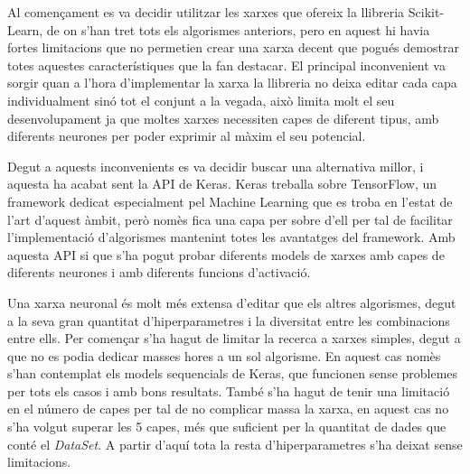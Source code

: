 \documentclass[10pt,a4paper,twocolumn,twoside]{article}
\begin{document}
Al començament es va decidir utilitzar les xarxes que ofereix la llibreria Scikit-Learn, de on s'han tret tots els algorismes anteriors, pero en aquest hi havia fortes limitacions que no permetien crear una xarxa decent que pogués demostrar totes aquestes característiques que la fan destacar. El principal inconvenient va sorgir quan a l'hora d'implementar la xarxa la llibreria no deixa editar cada capa individualment sinó tot el conjunt a la vegada, això limita molt el seu desenvolupament ja que moltes xarxes necessiten capes de diferent tipus, amb diferents neurones per poder exprimir al màxim el seu potencial. 

Degut a aquests inconvenients es va decidir buscar una alternativa millor, i aquesta ha acabat sent la API de Keras. Keras treballa sobre TensorFlow, un framework dedicat especialment pel Machine Learning que es troba en l'estat de l'art d'aquest àmbit, però nomès fica una capa per sobre d'ell per tal de facilitar l'implementació d'algorismes mantenint totes les avantatges del framework. Amb aquesta API si que s'ha pogut probar diferents models de xarxes amb capes de diferents neurones i amb diferents funcions d'activació. 

Una xarxa neuronal és molt més extensa d'editar que els altres algorismes, degut a la seva gran quantitat d'hiperparametres i la diversitat entre les combinacions entre ells. Per començar s'ha hagut de limitar la recerca a xarxes simples, degut a que no es podia dedicar masses hores a un sol algorisme. En aquest cas nomès s'han contemplat els models sequencials de Keras, que funcionen sense problemes per tots els casos i amb bons resultats. També s'ha hagut de tenir una limitació en el número de capes per tal de no complicar massa la xarxa, en aquest cas no s'ha volgut superar les 5 capes, més que suficient per la quantitat de dades que conté el \textit{DataSet}. A partir d'aquí tota la resta d'hiperparametres s'ha deixat sense limitacions.
\end{document}
